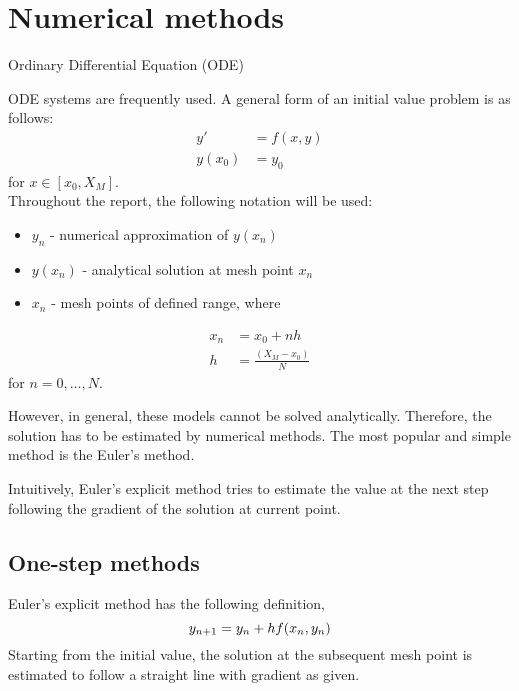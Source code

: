 \chapter{Numerical methods}
\label{chap:numerical-methods}
Ordinary Differential Equation (ODE) 

ODE systems are frequently used. A general form of an initial value problem is as follows: 
\begin{align}
    y'&=f(x,y)\\
    y(x_0) &= y_0
\end{align}
for $x \in [x_0, X_M]$. \\

Throughout the report, the following notation will be used:
\begin{itemize}
    \item $y_n$ - numerical approximation of $y(x_n)$
    \item $y(x_n)$ - analytical solution at mesh point $x_n$
    \item $x_n$ - mesh points of defined range, where
\end{itemize}

\begin{align}
    x_n &= x_0 + nh\\
    h &= \frac{(X_M - x_0)}{N}
\end{align}
for $n = 0,\dots, N$.

However, in general, these models cannot be solved analytically. Therefore, the solution has to be estimated by numerical methods. The most popular and simple method is the Euler's method.

Intuitively, Euler's explicit method tries to estimate the value at the next step following the gradient of the solution at current point.

\section{One-step methods}
\label{sec:one-step-method}
Euler's explicit method has the following definition,  
\begin{equation}
    y_{n+1} = y_n + hf(x_n,y_n)\\
\end{equation}
Starting from the initial value, the solution at the subsequent mesh point is estimated to follow a straight line with gradient as given.

